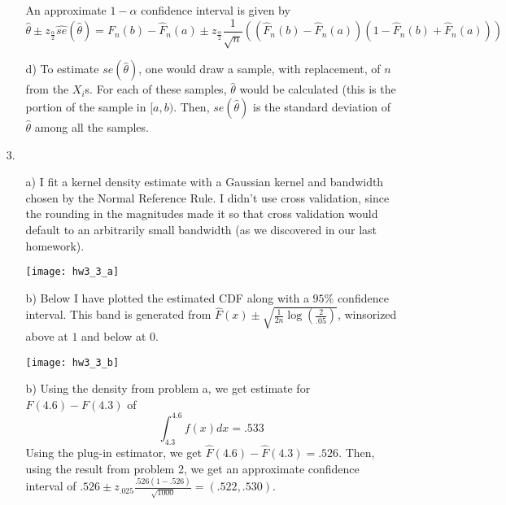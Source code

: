 \documentclass[11pt]{article}
\theoremstyle{definition}
\begin{document}
\begin{itemize}
\begin{itemize}
                An approximate \(1-\alpha\) confidence interval is given by 
                \[\hat \theta \pm z_{\frac{\alpha}{2}}\hat{se}(\hat \theta) = F_n(b)-\hat F_n(a) \pm z_{\frac{\alpha}{2}}\frac{1}{\sqrt{n}}\left((\hat F_n(b)-\hat F_n(a))(1-\hat F_n(b)+\hat F_n(a))\right)\]
            \item[d)]
                To estimate \(se(\hat \theta)\), one would draw a sample, with replacement, of $n$ from the $X_i$s. For each of these samples, $\hat\theta$ would be calculated (this is the portion of the sample in \([a,b)\). Then, \(se(\hat \theta)\) is the standard deviation of $\hat\theta$ among all the samples.

        \end{itemize}
    \item[3.]
        \begin{itemize}
            \item[a)]
                I fit a kernel density estimate with a Gaussian kernel and bandwidth chosen by the Normal Reference Rule. I didn't use cross validation, since the rounding in the magnitudes made it so that cross validation would default to an arbitrarily small bandwidth (as we discovered in our last homework).
                \begin{center}
                    \texttt{[image: hw3\_3\_a]}
                \end{center}
            \item[b)]
                Below I have plotted the estimated CDF along with a $95\%$ confidence interval. This band is generated from \(\hat F(x) \pm \sqrt{\frac{1}{2n}\log\left(\frac{2}{.05}\right)}\), winsorized above at $1$ and below at $0$.
                \begin{center}
                    \texttt{[image: hw3\_3\_b]}
                \end{center}
            \item[b)]
                Using the density from problem a, we get estimate for \(F(4.6)-F(4.3)\) of 
                \[\int_{4.3}^{4.6} f(x)dx = .533 \]
                Using the plug-in estimator, we get \(\hat F(4.6) - \hat F(4.3)=.526\). Then, using the result from problem 2, we get an approximate confidence interval of \(.526\pm z_{.025}\frac{.526(1-.526)}{\sqrt{1000}} = (.522,.530)\). 


\end{itemize}
\end{itemize}
\end{document}
